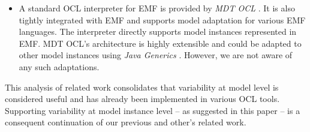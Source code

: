\begin{itemize}
\item A standard OCL interpreter for EMF is provided by \emph{MDT OCL}
\cite{WWW:MDT}. It is also tightly integrated with EMF and supports 
model adaptation for various EMF languages. The interpreter directly supports
model instances represented in EMF. MDT OCL's architecture is highly extensible
and could be adapted to other model instances using \emph{Java Generics} \cite{damus:EclipseCon08}. 
However, we are not aware of any such adaptations.

\end{itemize}

This analysis of related work consolidates that variability at model level is
con\-si\-dered useful and has already been implemented in various OCL tools.
Supporting variability at model instance level -- as suggested in this paper -- 
is a consequent continuation of our previous and other's related work.